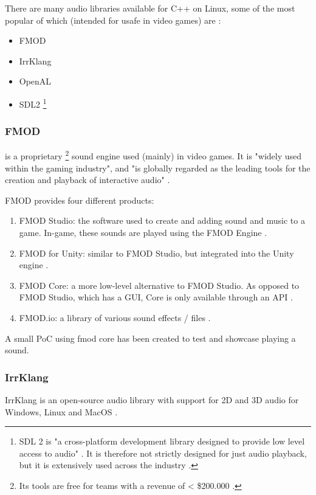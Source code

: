 \documentclass{article} %
\begin{document}
There are many audio libraries available for C++ on Linux, some of the most popular of which (intended for usafe in video games) are \cite{Szanto_2018}:
\begin{itemize}
	\item FMOD
	\item IrrKlang
	\item OpenAL
	\item SDL2 \footnote{SDL 2 is "a cross-platform development library designed to provide low level access to audio" \cite{sdl2}. It is therefore not strictly designed for just audio playback, but it is extensively used across the industry \cite{sdl2games}.}
\end{itemize}

\subsubsection{FMOD} is a proprietary \footnote{Its tools are free for teams with a revenue of < \$200.000 \cite{fmodStudio}.} sound engine used (mainly) in video games.
It is "widely used within the gaming industry", and "is globally regarded as the leading tools for the creation and playback of interactive audio" \cite{dolbyFmod}.

FMOD provides four different products:
\begin{enumerate}
	\item FMOD Studio: the software used to create and adding sound and music to a game. In-game, these sounds are played using the FMOD Engine \cite{fmodStudio}.
	\item FMOD for Unity: similar to FMOD Studio, but integrated into the Unity engine \cite{fmodUnity}.
	\item FMOD Core: a more low-level alternative to FMOD Studio. As opposed to FMOD Studio, which has a GUI, Core is only available through an API \cite{fmodCore}.
	\item FMOD.io: a library of various sound effects / files \cite{fmodIo}.
\end{enumerate}

A small PoC using fmod core has been created to test and showcase playing a sound.

\subsubsection{IrrKlang}
IrrKlang is an open-source audio library with support for 2D and 3D audio for Windows, Linux and MacOS \cite{IrrKlang}.
\end{document}
